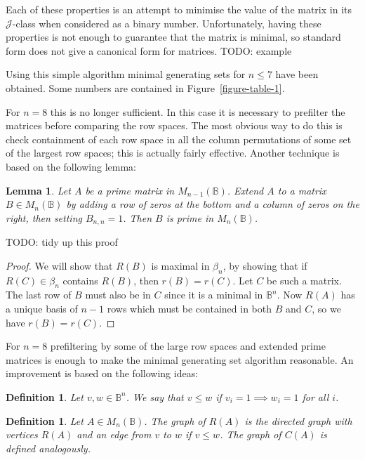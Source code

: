 \documentclass[11pt]{article}
\newtheorem{lemma}[thm]{Lemma}
\newtheorem{defi}[thm]{Definition}
\numberwithin{equation}{section}
\newcommand{\B}{\mathbb{B}}
\newcommand{\Bn}{M_n(\B)}
\newcommand{\J}{\mathscr{J}}
\begin{document}
Each of these properties is an attempt to minimise the value of the matrix in its $\J$-class when considered as a binary number.
Unfortunately, having these properties is not enough to guarantee that the matrix is minimal, so standard form does not give a canonical form for matrices.
TODO: example

Using this simple algorithm minimal generating sets for $n \leq 7$ have been obtained.
Some numbers are contained in Figure~\ref{figure-table-1}.

For $n=8$ this is no longer sufficient. In this case it is necessary to
prefilter the matrices before comparing the row spaces. The most obvious way
to do this is check containment of each row space in all the column permutations
of some set of the largest row spaces; this is actually fairly effective.
Another technique is based on the following lemma:

\begin{lemma}
  Let $A$ be a prime matrix in $M_{n-1}(\B)$. Extend $A$ to a matrix $B \in \Bn$
  by adding a row of zeros at the bottom and a column of zeros on the right,
  then setting $B_{n,n} = 1$. Then $B$ is prime in $\Bn$.
\end{lemma}
TODO: tidy up this proof
\begin{proof}
  We will show that $R(B)$ is maximal in $\beta_n$, by showing that if 
  $R(C) \in \beta_n$ contains $R(B)$, then $r(B) = r(C)$.
  Let $C$ be such a matrix.
  The last row of $B$ must also be in $C$ since it is a minimal in $\B^{n}$. 
  Now $R(A)$ has a unique basis of $n-1$ rows which must be contained in both $B$ and
  $C$, so we have $r(B) = r(C)$.
\end{proof}

For $n=8$ prefiltering by some of the large row spaces and extended prime
matrices is enough to make the minimal generating set algorithm reasonable.
An improvement is based on the following ideas:

\begin{defi}
  Let $v, w \in \B^n$. We say that $v \leq w$ if $v_i = 1 \implies w_i = 1$ for all $i$.
\end{defi}

\begin{defi}
  Let $A \in \Bn$. The \emph{graph} of $R(A)$ is the directed graph with vertices $R(A)$ and an edge from $v$ to $w$ if $v \leq w$. The graph of $C(A)$ is defined analogously. 
\end{defi}
\end{document}
